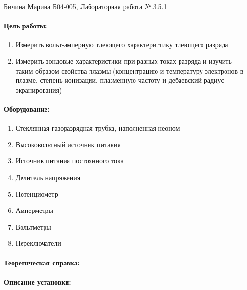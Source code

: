 \documentclass[a4paper,12pt]{article}
\author{Бичина Марина 
группа Б04-005 1 курса ФЭФМ}
\title{}
\date{}
\begin{document}

\begin{center}
\begin{Large}
{Бичина Марина Б04-005, Лабораторная работа №.3.5.1}
\end{Large}
\end{center}
\paragraph{Цель работы:} 
\begin{enumerate}
\itemsep0em
\item Измерить вольт-амперную тлеющего характеристику тлеющего разряда 
\item Измерить зондовые характеристики при разных токах разряда и изучить таким образом свойства плазмы (концентрацию и температуру электронов в плазме, степень ионизации,  плазменную частоту и дебаевский радиус экранирования)
\end{enumerate}
\paragraph{Оборудование:}
\begin{enumerate}
\itemsep0em
\item Стеклянная газоразрядная трубка, наполненная неоном
\item Высоковольтный источник питания 
\item Источник питания постоянного тока
\item Делитель напряжения
\item Потенциометр
\item Амперметры
\item Вольтметры
\item Переключатели
\end{enumerate}


\paragraph{Теоретическая справка:}
\paragraph{}

\paragraph{Описание установки:}
\end{document}
